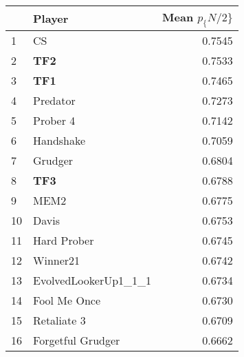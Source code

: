 \begin{tabular}{llr}
\toprule
{} &                Player &  Mean $p_\{N/2\}$ \\
\midrule
1  &                    CS &          0.7545 \\
2  &                   \textbf{TF2} &          0.7533 \\
3  &                   \textbf{TF1} &          0.7465 \\
4  &              Predator &          0.7273 \\
5  &              Prober 4 &          0.7142 \\
6  &             Handshake &          0.7059 \\
7  &               Grudger &          0.6804 \\
8  &                   \textbf{TF3} &          0.6788 \\
9  &                  MEM2 &          0.6775 \\
10 &                 Davis &          0.6753 \\
11 &           Hard Prober &          0.6745 \\
12 &              Winner21 &          0.6742 \\
13 &  EvolvedLookerUp1\_1\_1 &          0.6734 \\
14 &          Fool Me Once &          0.6730 \\
15 &           Retaliate 3 &          0.6709 \\
16 &     Forgetful Grudger &          0.6662 \\
\bottomrule
\end{tabular}
